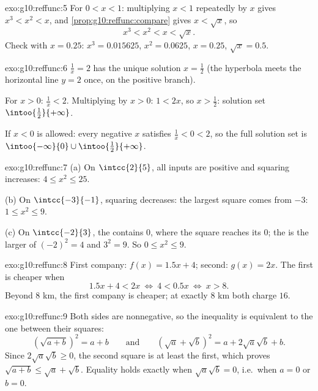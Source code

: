 \begin{solution}{exo:g10:reffunc:5}
For $0 < x < 1$: multiplying $x < 1$ repeatedly by $x$ gives
$x^3 < x^2 < x$, and \cref{prop:g10:reffunc:compare} gives $x < \sqrt x$,
so
\[
x^3 < x^2 < x < \sqrt x .
\]
Check with $x = 0.25$: $x^3 = 0.015625$, $x^2 = 0.0625$, $x = 0.25$,
$\sqrt x = 0.5$.
\end{solution}

\begin{solution}{exo:g10:reffunc:6}
$\frac1x = 2$ has the unique solution $x = \frac12$ (the hyperbola meets
the horizontal line $y = 2$ once, on the positive branch).

For $x > 0$: $\frac1x < 2$. Multiplying by $x > 0$: $1 < 2x$, so
$x > \frac12$: solution set $\intoo{\frac12}{+\infty}$.

If $x < 0$ is allowed: every negative $x$ satisfies $\frac1x < 0 < 2$,
so the full solution set is
$\intoo{-\infty}{0} \cup \intoo{\frac12}{+\infty}$.
\end{solution}

\begin{solution}{exo:g10:reffunc:7}
(a) On $\intcc{2}{5}$, all inputs are positive and squaring increases:
$4 \leq x^2 \leq 25$.

(b) On $\intcc{-3}{-1}$, squaring decreases:
the largest square comes from $-3$: $1 \leq x^2 \leq 9$.

(c) On $\intcc{-2}{3}$, the  contains $0$, where the square
reaches its  $0$; the  is the larger of $(-2)^2 = 4$ and
$3^2 = 9$. So $0 \leq x^2 \leq 9$.
\end{solution}

\begin{solution}{exo:g10:reffunc:8}
First company: $f(x) = 1.5x + 4$; second: $g(x) = 2x$. The first is
cheaper when
\[
1.5x + 4 < 2x
\ \Longleftrightarrow\
4 < 0.5x
\ \Longleftrightarrow\
x > 8 .
\]
Beyond $8$ km, the first company is cheaper; at exactly $8$ km both charge
$16$.
\end{solution}

\begin{solution}{exo:g10:reffunc:9}
Both sides are nonnegative, so the inequality is equivalent to the one
between their squares:
\[
\left(\sqrt{a+b}\right)^2 = a + b
\qquad\text{and}\qquad
\left(\sqrt a + \sqrt b\right)^2 = a + 2\sqrt a \sqrt b + b .
\]
Since $2\sqrt a\sqrt b \geq 0$, the second square is at least the first,
which proves $\sqrt{a+b} \leq \sqrt a + \sqrt b$. Equality holds exactly
when $\sqrt a \sqrt b = 0$, i.e.\ when $a = 0$ or $b = 0$.
\end{solution}

